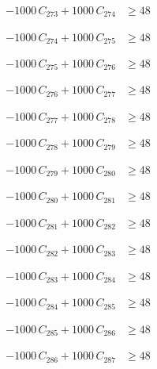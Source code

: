 \documentclass[a4paper,11pt]{article}
\begin{document}
\begin{align}
-1000\,C_{273} + 1000\,C_{274} &\geq 48 \nonumber
\end{align}

\begin{align}
-1000\,C_{274} + 1000\,C_{275} &\geq 48 \nonumber
\end{align}

\begin{align}
-1000\,C_{275} + 1000\,C_{276} &\geq 48 \nonumber
\end{align}

\begin{align}
-1000\,C_{276} + 1000\,C_{277} &\geq 48 \nonumber
\end{align}

\begin{align}
-1000\,C_{277} + 1000\,C_{278} &\geq 48 \nonumber
\end{align}

\begin{align}
-1000\,C_{278} + 1000\,C_{279} &\geq 48 \nonumber
\end{align}

\begin{align}
-1000\,C_{279} + 1000\,C_{280} &\geq 48 \nonumber
\end{align}

\begin{align}
-1000\,C_{280} + 1000\,C_{281} &\geq 48 \nonumber
\end{align}

\begin{align}
-1000\,C_{281} + 1000\,C_{282} &\geq 48 \nonumber
\end{align}

\begin{align}
-1000\,C_{282} + 1000\,C_{283} &\geq 48 \nonumber
\end{align}

\begin{align}
-1000\,C_{283} + 1000\,C_{284} &\geq 48 \nonumber
\end{align}

\begin{align}
-1000\,C_{284} + 1000\,C_{285} &\geq 48 \nonumber
\end{align}

\begin{align}
-1000\,C_{285} + 1000\,C_{286} &\geq 48 \nonumber
\end{align}

\begin{align}
-1000\,C_{286} + 1000\,C_{287} &\geq 48 \nonumber
\end{align}
\end{document}

